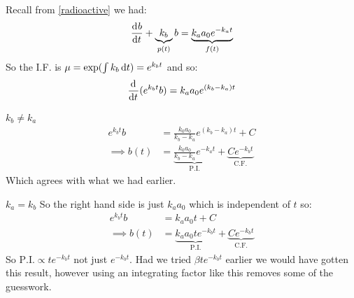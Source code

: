 \documentclass[../main.tex]{subfiles}
\begin{document}
\begin{example}
  Recall from \cref{radioactive} we had:
  \[
    \deriv{b}{t} + \underbrace{k_b}_{p(t)}b = \underbrace{k_a a_0 e^{-k_a t}}_{f(t)}
  \]
  So the I.F. is $\mu = \exp(\int k_b \d{t}) = e^{k_b t}$ and so:
  \[
    \deriv{}{t}(e^{k_b t}b) = k_a a_0 e^{(k_b - k_a)t}
  \]
  \begin{proofcases}
    \begin{case}{$k_b \neq k_a$}
      \begin{align*}
        e^{k_b t}b &= \frac{k_0 a_0}{k_b - k_a}e^{(k_b - k_a)t} +C \\
        \implies  b(t) &= \underbrace{\frac{k_0 a_0}{k_b - k_a}e^{-k_a t}}_{\text{P.I.}} + \underbrace{Ce^{-k_b t}}_{\text{C.F.}}
      \end{align*}
      Which agrees with what we had earlier.
    \end{case}
    \label{differentPI}
    \begin{case}{$k_a = k_b$}
      So the right hand side is just $k_a a_0$ which is independent of $t$ so:
      \begin{align*}
        e^{k_b t}b &= k_a a_0 t + C \\
        \implies b(t) &= \underbrace{k_a a_0 t e^{-k_b t}}_{\text{P.I.}} + \underbrace{Ce^{-k_b t}}_{\text{C.F.}}
      \end{align*}
      So $\text{P.I.} \propto t e^{-k_b t}$ not just $e^{-k_b t}$.
      Had we tried $\beta t e^{-k_b t}$ earlier we would have gotten this result, however using an integrating factor like this removes some of the guesswork.
      \begin{center}
      \end{center}
    \end{case}
  \end{proofcases}
\end{example}
\end{document}
